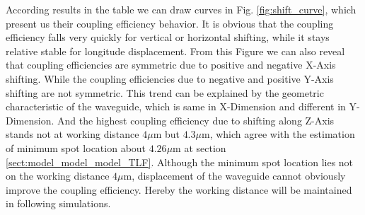 According results in the table we can draw curves in Fig. \ref{fig:shift_curve}, which present us their coupling efficiency behavior. It is obvious that the coupling efficiency falls very quickly for vertical or horizontal shifting, while it stays relative stable for longitude displacement. From this Figure we can also reveal that coupling efficiencies are symmetric due to positive and negative X-Axis shifting. While the coupling efficiencies due to negative and positive Y-Axis shifting are not symmetric. This trend can be explained by the geometric characteristic of the waveguide, which is same in X-Dimension and different in Y-Dimension. And the highest coupling efficiency due to shifting along Z-Axis stands not at working distance $4\mu$m but $4.3\mu$m, which agree with the estimation of minimum spot location about $4.26\mu$m at section \ref{sect:model_model_model_TLF}. Although the minimum spot location lies not on the working distance $4\mu$m, displacement of the waveguide cannot obviously improve the coupling efficiency. Hereby the working distance will be maintained in following simulations.\\
  
